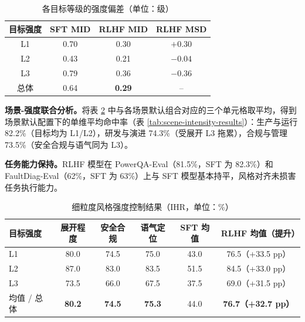 \documentclass[fontset=fandol,type=master,campus=shenzhen,etitleauto=true]{hithesisbook}
\begin{document}
\begin{table}[htbp]
\centering
\caption{各目标等级的强度偏差（单位：级）}
\label{tab:intensity-mid}
\small
\renewcommand{\arraystretch}{1.15}
\begin{tabular}{c c c c}
\toprule
\textbf{目标强度} & \textbf{SFT MID} & \textbf{RLHF MID} & \textbf{RLHF MSD} \\
\midrule
L1 & 0.70 & 0.30 & $+0.30$ \\
L2 & 0.43 & 0.21 & $-0.04$ \\
L3 & 0.79 & 0.36 & $-0.36$ \\
\midrule
总体 & 0.64 & \textbf{0.29} & -- \\
\bottomrule
\end{tabular}
\end{table}

\textbf{场景-强度联合分析。}将表 \ref{tab:intensity-results} 中与各场景默认组合对应的三个单元格取平均，得到场景默认配置下的单维平均命中率（表 \ref{tab:scene-intensity-results}）：生产与运行 82.2\%（目标均为 L1/L2），研发与演进 74.3\%（受展开 L3 拖累），合规与管理 73.5\%（安全合规与语气同为 L3）。

\textbf{任务能力保持。}RLHF 模型在 PowerQA-Eval（81.5\%，SFT 为 82.3\%）和 FaultDiag-Eval（62\%，SFT 为 63\%）上与 SFT 模型基本持平，风格对齐未损害任务执行能力。

\begin{table}[htbp]
\centering
\caption{细粒度风格强度控制结果（IHR，单位：\%）}
\label{tab:intensity-results}
\small
\setlength{\tabcolsep}{6pt}
\renewcommand{\arraystretch}{1.15}
\begin{tabular}{l c c c c c}
\toprule
\textbf{目标强度} & \textbf{展开程度} & \textbf{安全合规} & \textbf{语气定位} & \textbf{SFT 均值} & \textbf{RLHF 均值（提升）} \\
\midrule
L1 & 80.0 & 74.5 & 75.0 & 43.0 & 76.5（+33.5 pp） \\
L2 & 87.0 & 83.0 & 83.5 & 51.5 & 84.5（+33.0 pp） \\
L3 & 73.5 & 66.0 & 67.5 & 37.5 & 69.0（+31.5 pp） \\
\midrule
均值 / 总体 & \textbf{80.2} & \textbf{74.5} & \textbf{75.3} & 44.0 & \textbf{76.7（+32.7 pp）} \\
\bottomrule
\end{tabular}
\end{table}
\end{document}
